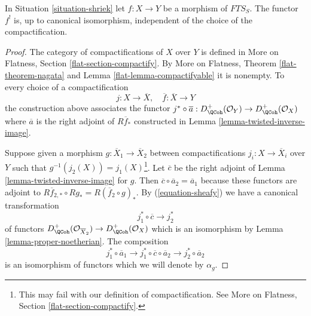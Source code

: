 \begin{lemma}
\label{lemma-shriek-well-defined}
In Situation \ref{situation-shriek} let $f : X \to Y$ be a morphism
of $\textit{FTS}_S$. The functor $f^!$ is, up to canonical isomorphism,
independent of the choice of the compactification.
\end{lemma}

\begin{proof}
The category of compactifications of $X$ over $Y$ is defined
in More on Flatness, Section \ref{flat-section-compactify}.
By More on Flatness, Theorem \ref{flat-theorem-nagata} and
Lemma \ref{flat-lemma-compactifyable} it is nonempty.
To every choice of a compactification
$$
j : X \to \overline{X},\quad \overline{f} : \overline{X} \to Y
$$
the construction above associates the functor $j^* \circ \overline{a} :
D_\QCoh^+(\mathcal{O}_Y) \to D_\QCoh^+(\mathcal{O}_X)$
where $\overline{a}$ is the right adjoint of $R\overline{f}_*$
constructed in Lemma \ref{lemma-twisted-inverse-image}.

\medskip\noindent
Suppose given a morphism $g : \overline{X}_1 \to \overline{X}_2$
between compactifications $j_i : X \to \overline{X}_i$ over $Y$
such that $g^{-1}(j_2(X)) = j_1(X)$\footnote{This may fail
with our definition of compactification. See
More on Flatness, Section \ref{flat-section-compactify}.}.
Let $\overline{c}$ be the right adjoint of
Lemma \ref{lemma-twisted-inverse-image} for $g$.
Then $\overline{c} \circ \overline{a}_2 = \overline{a}_1$
because these functors are adjoint to
$R\overline{f}_{2, *} \circ Rg_* = R(\overline{f}_2 \circ g)_*$.
By (\ref{equation-sheafy}) we have a canonical transformation
$$
j_1^* \circ \overline{c} \longrightarrow j_2^*
$$
of functors
$D^+_\QCoh(\mathcal{O}_{\overline{X}_2}) \to D^+_\QCoh(\mathcal{O}_X)$
which is an isomorphism by Lemma \ref{lemma-proper-noetherian}.
The composition
$$
j_1^* \circ \overline{a}_1 \longrightarrow
j_1^* \circ \overline{c} \circ \overline{a}_2 \longrightarrow
j_2^* \circ \overline{a}_2
$$
is an isomorphism of functors which we will denote by $\alpha_g$.


\end{proof}
